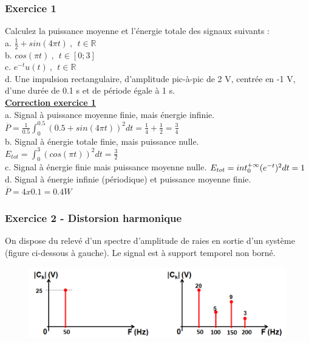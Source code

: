 \documentclass[11pt]{report}
\begin{document}
	
	\subsubsection{Exercice 1}
	
	Calculez la puissance moyenne et l'énergie totale des signaux suivants :\\
	
	a. $\frac{1}{2}+sin(4\pi t)~,~~t \in \mathbb{R}$\\
	
	b. $cos(\pi t)~,~~t \in [0;3]$\\
	
	c. $e^{-t}u(t)~,~~t \in \mathbb{R}$\\
	
	d. Une impulsion rectangulaire, d'amplitude pic-à-pic de 2 V, centrée en -1 V, d'une durée de 0.1 s et de période égale à 1 s.\\
	
	\textbf{\underline{Correction exercice 1}}\\
	
	a. Signal à puissance moyenne finie, mais énergie infinie.  $\overline{P}=\frac{1}{0.5}\int_{0}^{0.5}(0.5+sin(4\pi t))^{2}dt=\frac{1}{4}+\frac{1}{2}=\frac{3}{4}$\\
	
	b. Signal à énergie totale finie, mais puissance nulle. $E_{tot}=\int_{0}^{3}(cos(\pi t))^{2}dt=\frac{3}{2}$\\
	
	c. Signal à énergie finie mais puissance moyenne nulle. $E_{tot}=\\int_{0}^{+\infty}(e^{-t})^{2}dt=1$\\ 
	
	d. Signal à énergie infinie (périodique) et puissance moyenne finie. $\overline{P}=4x0.1=0.4 W$\\
	
	
	\subsubsection{Exercice 2 - Distorsion harmonique}
	
	On dispose du relevé d'un spectre d'amplitude de raies en sortie d'un système (figure ci-dessous à gauche). Le signal est à support temporel non borné.
	
	\begin{figure}[h!]
		\centering
		\includegraphics[scale=0.5]{images/Exo_8_2.png} 
	\end{figure}
	
\end{document}

